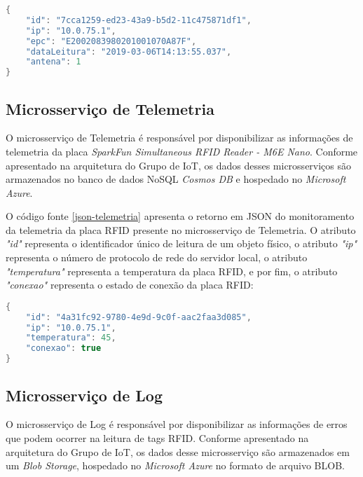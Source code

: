 \newpage

\begin{lstlisting}[language=Java, caption={JSON de resposta do microsserviço de Leitura.}, label=json-leitura]
{
    "id": "7cca1259-ed23-43a9-b5d2-11c475871df1",
    "ip": "10.0.75.1",
    "epc": "E2002083980201001070A87F",
    "dataLeitura": "2019-03-06T14:13:55.037",
    "antena": 1
}
\end{lstlisting}

\subsection{Microsserviço de Telemetria}

O microsserviço de Telemetria é responsável por disponibilizar as informações de telemetria da placa \textit{SparkFun Simultaneous RFID Reader - M6E Nano}. Conforme apresentado na arquitetura do Grupo de \acrlong{IoT}, os dados desses microsserviços são armazenados no banco de dados \acrshort{NoSQL} \textit{Cosmos DB} e hospedado no \textit{Microsoft Azure}.

O código fonte \ref{json-telemetria} apresenta o retorno em \acrshort{JSON} do monitoramento da telemetria da placa \acrshort{RFID} presente no microsserviço de Telemetria. O atributo \textit{"id"} representa o identificador único de leitura de um objeto físico, o atributo \textit{"ip"} representa o número de protocolo de rede do servidor local, o atributo \textit{"temperatura"} representa a temperatura da placa \acrshort{RFID}, e por fim, o atributo \textit{"conexao"} representa o estado de conexão da placa \acrshort{RFID}:

\begin{lstlisting}[language=Java, caption={JSON de resposta do microsserviço de Telemetria.}, label=json-telemetria]
{
    "id": "4a31fc92-9780-4e9d-9c0f-aac2faa3d085",
    "ip": "10.0.75.1",
    "temperatura": 45,
    "conexao": true
}
\end{lstlisting}

\subsection{Microsserviço de Log}

O microsserviço de Log é responsável por disponibilizar as informações de erros que podem ocorrer na leitura de tags \acrshort{RFID}. Conforme apresentado na arquitetura do Grupo de \acrlong{IoT}, os dados desse microsserviço são armazenados em um \textit{Blob Storage}, hospedado no \textit{Microsoft Azure} no formato de arquivo \acrshort{BLOB}. 


